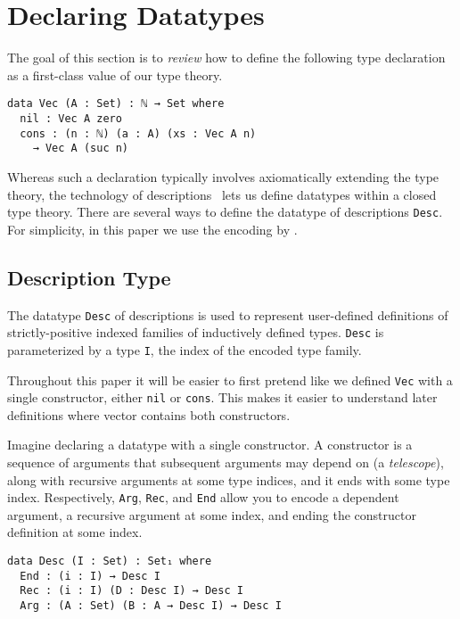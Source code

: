 \documentclass[preprint,nonatbib]{sigplanconf}
\begin{document}
\section{Declaring Datatypes}
\label{sec:background}

The goal of this section is to {\it review} how to define the following type
declaration as a first-class value of our type theory. 

\begin{verbatim}
data Vec (A : Set) : ℕ → Set where
  nil : Vec A zero
  cons : (n : ℕ) (a : A) (xs : Vec A n)
    → Vec A (suc n)
\end{verbatim}

Whereas such a declaration typically involves axiomatically extending
the type theory, the technology of
descriptions~\citep{Chapman:2010:GAL:1932681.1863547,mcbride2010ornamental,dagand:phd}
lets us define datatypes within a closed type theory.
There are
several ways to define the datatype of descriptions {\tt Desc}. 
For simplicity, in this paper we use the encoding by
\citet{mcbride2010ornamental}.

\subsection{Description Type}

The datatype {\tt Desc} of descriptions is used to represent
user-defined definitions of strictly-positive indexed
families of inductively defined types.
{\tt Desc} is parameterized by 
a type {\tt I}, the index of the encoded type family.

Throughout this paper it will be easier to first pretend like we
defined {\tt Vec} with a single constructor, either
{\tt nil} or {\tt cons}. This makes it easier to understand
later definitions where vector contains both constructors.

Imagine declaring a datatype with a single constructor.
A constructor is a sequence of
arguments that subsequent arguments may depend on (a {\it telescope}), along with
recursive arguments at some type indices, and it ends with some type index.
Respectively, {\tt Arg}, {\tt Rec}, and {\tt End} allow you to encode
a dependent argument, a recursive argument at some index, and ending the
constructor definition at some index.

\begin{verbatim}
data Desc (I : Set) : Set₁ where
  End : (i : I) → Desc I
  Rec : (i : I) (D : Desc I) → Desc I
  Arg : (A : Set) (B : A → Desc I) → Desc I
\end{verbatim}
\end{document}
